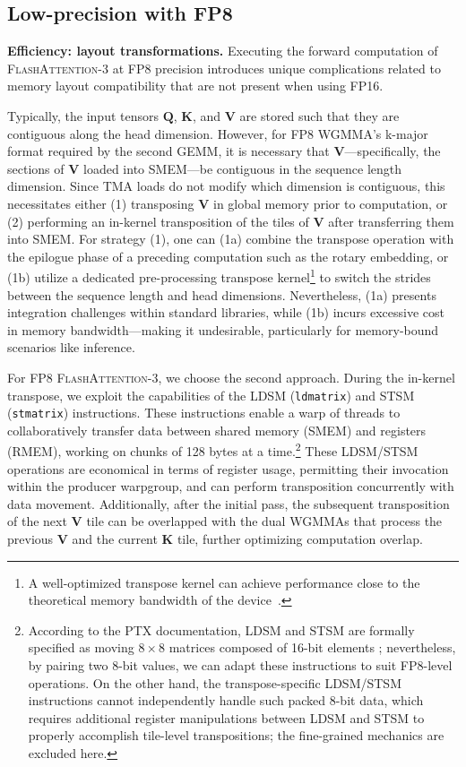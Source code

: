 \begin{algorithm}[H]
\begin{algorithmic}[1]
\subsection{Low-precision with FP8}
\label{sec:algofp8}

\textbf{Efficiency: layout transformations.} Executing the forward computation of \textsc{FlashAttention-3} at FP8 precision introduces unique complications related to memory layout compatibility that are not present when using FP16.

Typically, the input tensors $\mathbf{Q}$, $\mathbf{K}$, and $\mathbf{V}$ are stored such that they are contiguous along the head dimension. However, for FP8 WGMMA’s k-major format required by the second GEMM, it is necessary that $\mathbf{V}$—specifically, the sections of $\mathbf{V}$ loaded into SMEM—be contiguous in the sequence length dimension. Since TMA loads do not modify which dimension is contiguous, this necessitates either (1) transposing $\mathbf{V}$ in global memory prior to computation, or (2) performing an in-kernel transposition of the tiles of $\mathbf{V}$ after transferring them into SMEM. For strategy (1), one can (1a) combine the transpose operation with the epilogue phase of a preceding computation such as the rotary embedding, or (1b) utilize a dedicated pre-processing transpose kernel\footnote{A well-optimized transpose kernel can achieve performance close to the theoretical memory bandwidth of the device~\citep{colfax_cutlass_transpose_2024}.} to switch the strides between the sequence length and head dimensions. Nevertheless, (1a) presents integration challenges within standard libraries, while (1b) incurs excessive cost in memory bandwidth—making it undesirable, particularly for memory-bound scenarios like inference.

For FP8 \textsc{FlashAttention-3}, we choose the second approach. During the in-kernel transpose, we exploit the capabilities of the LDSM (\verb|ldmatrix|) and STSM (\verb|stmatrix|) instructions. These instructions enable a warp of threads to collaboratively transfer data between shared memory (SMEM) and registers (RMEM), working on chunks of 128 bytes at a time.\footnote{According to the PTX documentation, LDSM and STSM are formally specified as moving $8 \times 8$ matrices composed of 16-bit elements \cite[\S 9.7.13.4.15-16]{ptx}; nevertheless, by pairing two 8-bit values, we can adapt these instructions to suit FP8-level operations. On the other hand, the transpose-specific LDSM/STSM instructions cannot independently handle such packed 8-bit data, which requires additional register manipulations between LDSM and STSM to properly accomplish tile-level transpositions; the fine-grained mechanics are excluded here.} These LDSM/STSM operations are economical in terms of register usage, permitting their invocation within the producer warpgroup, and can perform transposition concurrently with data movement. Additionally, after the initial pass, the subsequent transposition of the next $\mathbf{V}$ tile can be overlapped with the dual WGMMAs that process the previous $\mathbf{V}$ and the current $\mathbf{K}$ tile, further optimizing computation overlap.


\end{algorithmic}
\end{algorithm}
